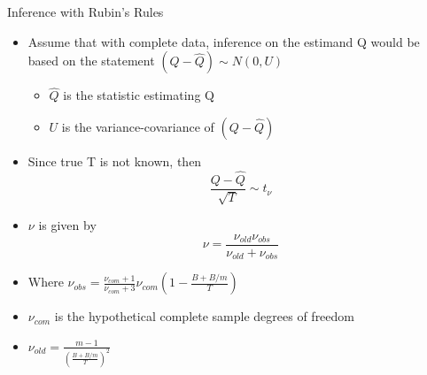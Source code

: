 \begin{frame}{Inference with Rubin's Rules}
 \begin{itemize}
  \item Assume that with complete data, inference on the estimand
  Q would be based on the statement $(Q- \hat{Q})\sim N(0,U)$
  \begin{itemize}
   \item $\hat{Q}$ is the statistic estimating Q
   \item $U$ is the variance-covariance of $(Q-\hat{Q})$
  \end{itemize}
   \item Since true T is not known, then
  $$\frac{Q-\hat{Q}}{\sqrt{T}}\sim t_{\nu}$$
  \item $\nu$ is given by \cite{Barnard1999}
  $$\nu=\frac{\nu_{old}\nu_{obs}}{\nu_{old}+\nu_{obs}}$$
\item Where $\nu_{obs}=\frac{\nu_{com}+1}{\nu_{com}+3}\nu_{com}(1-\frac{B + B/m}{T})$
\item $\nu_{com}$ is the hypothetical complete sample degrees of freedom
\item $\nu_{old}=\frac{m-1}{(\frac{B + B/m}{T})^2}$ 
 \end{itemize}

\end{frame}